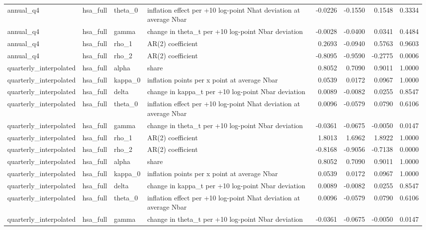\begin{tabular}{llllrrrr}
annual\_q4 & hsa\_full & theta\_0 & inflation effect per +10 log-point Nhat deviation at average Nbar & -0.0226 & -0.1550 & 0.1548 & 0.3334 \\
annual\_q4 & hsa\_full & gamma & change in theta\_t per +10 log-point Nbar deviation & -0.0028 & -0.0400 & 0.0341 & 0.4484 \\
annual\_q4 & hsa\_full & rho\_1 & AR(2) coefficient & 0.2693 & -0.0940 & 0.5763 & 0.9603 \\
annual\_q4 & hsa\_full & rho\_2 & AR(2) coefficient & -0.8095 & -0.9590 & -0.2775 & 0.0006 \\
quarterly\_interpolated & hsa\_full & alpha & share & 0.8052 & 0.7090 & 0.9011 & 1.0000 \\
quarterly\_interpolated & hsa\_full & kappa\_0 & inflation points per x point at average Nbar & 0.0539 & 0.0172 & 0.0967 & 1.0000 \\
quarterly\_interpolated & hsa\_full & delta & change in kappa\_t per +10 log-point Nbar deviation & 0.0089 & -0.0082 & 0.0255 & 0.8547 \\
quarterly\_interpolated & hsa\_full & theta\_0 & inflation effect per +10 log-point Nhat deviation at average Nbar & 0.0096 & -0.0579 & 0.0790 & 0.6106 \\
quarterly\_interpolated & hsa\_full & gamma & change in theta\_t per +10 log-point Nbar deviation & -0.0361 & -0.0675 & -0.0050 & 0.0147 \\
quarterly\_interpolated & hsa\_full & rho\_1 & AR(2) coefficient & 1.8013 & 1.6962 & 1.8922 & 1.0000 \\
quarterly\_interpolated & hsa\_full & rho\_2 & AR(2) coefficient & -0.8168 & -0.9056 & -0.7138 & 0.0000 \\
quarterly\_interpolated & hsa\_full & alpha & share & 0.8052 & 0.7090 & 0.9011 & 1.0000 \\
quarterly\_interpolated & hsa\_full & kappa\_0 & inflation points per x point at average Nbar & 0.0539 & 0.0172 & 0.0967 & 1.0000 \\
quarterly\_interpolated & hsa\_full & delta & change in kappa\_t per +10 log-point Nbar deviation & 0.0089 & -0.0082 & 0.0255 & 0.8547 \\
quarterly\_interpolated & hsa\_full & theta\_0 & inflation effect per +10 log-point Nhat deviation at average Nbar & 0.0096 & -0.0579 & 0.0790 & 0.6106 \\
quarterly\_interpolated & hsa\_full & gamma & change in theta\_t per +10 log-point Nbar deviation & -0.0361 & -0.0675 & -0.0050 & 0.0147 \\

\end{tabular}
